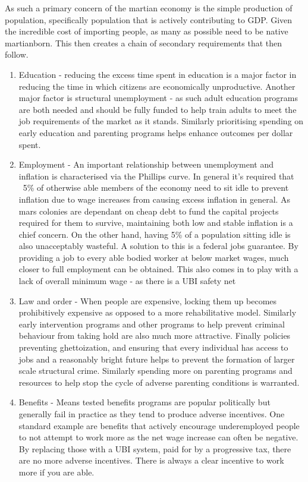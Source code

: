 \documentclass[10pt]{article}
\begin{document}
As such a primary concern of the martian economy is the simple production of population, specifically population that is actively contributing to GDP. Given the incredible cost of importing people, as many as possible need to be native martianborn. This then creates a chain of secondary requirements that then follow.

\begin{enumerate}

\item Education - reducing the excess time spent in education is a major factor in reducing the time in which citizens are economically unproductive. Another major factor is structural unemployment - as such adult education programs are both needed and should be fully funded to help train adults to meet the job requirements of the market as it stands. Similarly prioritising spending on early education and parenting programs helps enhance outcomes per dollar spent.

\item Employment - An important relationship between unemployment and inflation is characterised via the Phillips curve. In general it's required that ~5\% of otherwise able members of the economy need to sit idle to prevent inflation due to wage increases from causing excess inflation in general. As mars colonies are dependant on cheap debt to fund the capital projects required for them to survive, maintaining both low and stable inflation is a chief concern. On the other hand, having 5\% of a population sitting idle is also unacceptably wasteful. A solution to this is a federal jobs guarantee. By providing a job to every able bodied worker at below market wages, much closer to full employment can be obtained. This also comes in to play with a lack of overall minimum wage - as there is a UBI safety net 

\item Law and order - When people are expensive, locking them up becomes prohibitively expensive as opposed to a more rehabilitative model. Similarly early intervention programs and other programs to help prevent criminal behaviour from taking hold are also much more attractive. Finally policies preventing ghettoization, and ensuring that every individual has access to jobs and a reasonably bright future helps to prevent the formation of larger scale structural crime. Similarly spending more on parenting programs and resources to help stop the cycle of adverse parenting conditions is warranted.

\item Benefits - Means tested benefits programs are popular politically but generally fail in practice as they tend to produce adverse incentives. One standard example are benefits that actively encourage underemployed people to not attempt to work more as the net wage increase can often be negative. By replacing those with a UBI system, paid for by a progressive tax, there are no more adverse incentives. There is always a clear incentive to work more if you are able. 


\end{enumerate}
\end{document}
